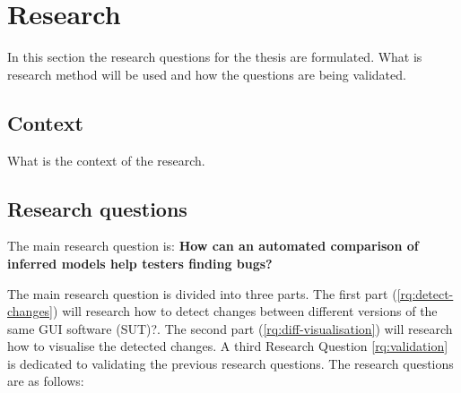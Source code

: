 \section{Research} \label{questions}
    In this section the research questions for the thesis are formulated. What is research method will be used and how the questions are being validated.

    \subsection{Context}
    What is the context of the research. 
    
    
    
\subsection{Research questions}
        
The main research question is: \textbf{How can an automated comparison of inferred models help testers finding bugs?}

The main research question is divided into three parts. The first part (\ref{rq:detect-changes}) will research how to detect changes between different versions of the same GUI software (SUT)?\cite{testar-todo}. The second part (\ref{rq:diff-visualisation}) will research how to visualise the detected changes. A third Research Question \ref{rq:validation} is dedicated to validating the previous research questions. The research questions are as follows: 

